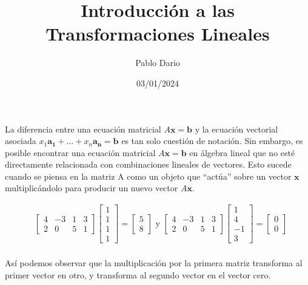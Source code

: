 \documentclass[12 pt]{article}
\title{Introducción a las Transformaciones Lineales}
\author{Pablo Dario}
\date{03/01/2024}
\begin{document}
\maketitle

La diferencia entre una ecuación matricial $A\mathbf{x} = \mathbf{b}$ y la ecuación vectorial asociada ${x_1\mathbf{a_1} + \dots + x_n\mathbf{a_n}= \mathbf{b}}$ es tan solo cuestión de notación. Sin embargo, es posible encontrar una ecuación matricial $A\mathbf{x} = \mathbf{b}$ en álgebra lineal que no esté directamente relacionada con combinaciones lineales de vectores. Esto sucede cuando se piensa en la matriz A como un objeto que “actúa” sobre un vector $\mathbf{x}$ multiplicándolo para producir un nuevo vector $A\mathbf{x}$.
 
\begin{equation}
    \begin{aligned}
        & {\left[\begin{array}{rrrr}
        4 & -3 & 1 & 3 \\
        2 & 0 & 5 & 1
        \end{array}\right]\left[\begin{array}{l}
        1 \\ 1 \\ 1 \\ 1
        \end{array}\right]=\left[\begin{array}{l}
        5 \\ 8
        \end{array}\right] \text { y }\left[\begin{array}{rrrr}
        4 & -3 & 1 & 3 \\
        2 & 0 & 5 & 1
        \end{array}\right]\left[\begin{array}{r}
        1 \\ 4 \\ -1 \\ 3
        \end{array}\right]=\left[\begin{array}{l}
        0 \\ 0
        \end{array}\right]} \\
    \end{aligned}
\end{equation}

Así podemos observar que la multiplicación por la primera matriz transforma al primer vector en otro, y transforma al segundo vector en el vector cero.
\end{document}
